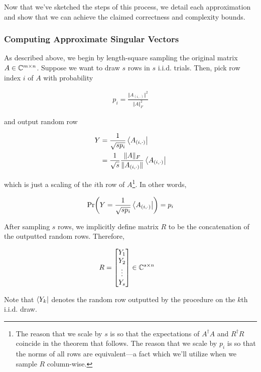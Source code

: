 \documentclass[main.tex]{subfiles}
\begin{document}
Now that we've sketched the steps of this process, we detail each approximation and show that we can achieve the claimed correctness and complexity bounds.

\subsubsection{Computing Approximate Singular Vectors}

As described above, we begin by length-square sampling the original matrix $A \in \mathbb{C}^{m \times n }$. Suppose we want to draw $s$ rows in $s$ i.i.d. trials. Then, pick row index $i$ of $A$ with probability

\begin{align}
\label{def:A-prob}
p_i = \frac{\Vert A_{(i, \cdot)}\Vert^2}{\Vert A \Vert_F^2} 	
\end{align}

and output random row 

\begin{align*}
 	Y &= \frac{1}{\sqrt{s p_i}} \bra{A_{(i, \cdot)}} \\\
 	&= \frac{1}{\sqrt{s}}\frac{\Vert A\Vert_F}{\Vert A_{(i, \cdot)}\Vert}\bra{A_{(i, \cdot)}}
\end{align*}

which is just a scaling of the $i$th row of $A$\footnote{The reason that we scale by $s$ is so that the expectations of $A^\dag A$ and $R^\dag R$ coincide in the theorem that follows. The reason that we scale by $p_i$ is so that the norms of all rows are equivalent---a fact which we'll utilize when we sample $R$ column-wise.}. In other words,

\begin{align*}
\Pr(Y = \frac{1}{\sqrt{s p_i}} \bra{A_{(i, \cdot)}}) = p_i
\end{align*}


After sampling $s$ rows, we implicitly define matrix $R$ to be the concatenation of the outputted random rows. Therefore,

\begin{align}
\label{def:R}
R &= \begin{bmatrix}
Y_1 \\
Y_2 \\
\vdots \\
Y_s
\end{bmatrix} \in \mathbb{C}^{s \times n}
\end{align}

Note that $\bra{Y_k}$ denotes the random row outputted by the procedure on the $k$th i.i.d. draw.
\end{document}
